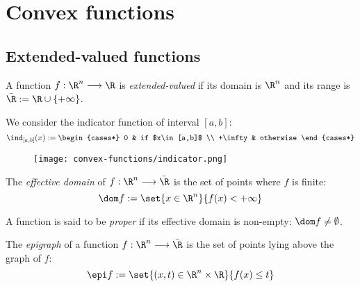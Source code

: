 \section{Convex functions}
\subsection{Extended-valued functions}
\begin{definition}
    A function $f: \R^n \longrightarrow \R$ is \emph{extended-valued} if its domain is $\R^n$ and its range is $\bar{\R} := \R \cup \{+\infty\}$.
\end{definition}

\begin{example}
    We consider the indicator function of interval $[a, b]$:
    \begin{equation*}
        \ind_{[a,b]}(x) := \begin{cases*}
            0 & if $x\in[a,b]$ \\
            +\infty & otherwise
        \end{cases*}
    \end{equation*}
    \begin{figure}[H]
        \centering
        \texttt{[image: convex-functions/indicator.png]}
    \end{figure}
\end{example}

\begin{definition}
    The \emph{effective domain} of $f:\R^n\longrightarrow\bar{\R}$ is the set of points where $f$ is finite:
    \begin{equation*}
        \dom f := \set{x\in\R^n}{f(x)<+\infty}
    \end{equation*}
\end{definition}

A function is said to be \emph{proper} if its effective domain is non-empty: $\dom f \neq \emptyset$.

\begin{definition}[Epigraph]
    The \emph{epigraph} of a function $f:\R^n\longrightarrow\bar{\R}$ is the set of points lying above the graph of $f$:
    \begin{equation*}
        \epi f := \set{(x, t)\in\R^n\times\R}{f(x)\leq t}
    \end{equation*}
\end{definition}